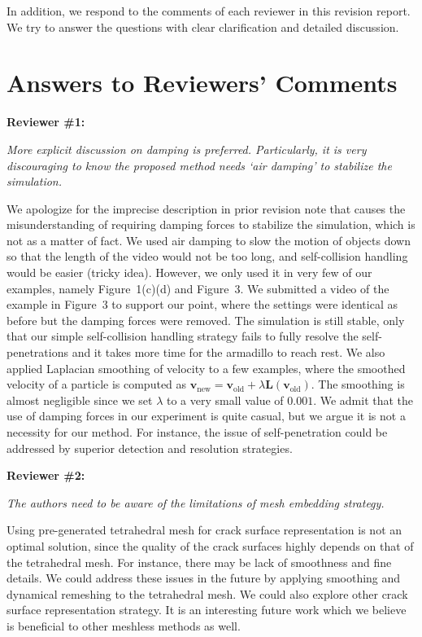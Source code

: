 In addition, we respond to the comments of each reviewer in this revision report. We try to answer the questions with clear clarification and detailed discussion.
\section{Answers to Reviewers' Comments}

\noindent{}\textbf{Reviewer \#1:}

\emph{More explicit discussion on damping is preferred. Particularly, it is very discouraging to know the proposed method needs `air damping' to stabilize the simulation.}

We apologize for the imprecise description in prior revision note that causes the misunderstanding of requiring damping forces to stabilize the simulation, which is not as a matter of fact. We used air damping to slow the motion of objects down so that the length of the video would not be too long, and self-collision handling would be easier (tricky idea). However, we only used it in very few of our examples, namely Figure~1(c)(d) and Figure~3. We submitted a video of the example in Figure~3 to support our point, where the settings were identical as before but the damping forces were removed. The simulation is still stable, only that our simple self-collision handling strategy fails to fully resolve the self-penetrations and it takes more time for the armadillo to reach rest. We also applied Laplacian smoothing of velocity to a few examples, where the smoothed velocity of a particle is computed as $\mathbf{v}_{\mathrm{new}}=\mathbf{v}_{\mathrm{old}}+\lambda \mathbf{L}(\mathbf{v}_{\mathrm{old}})$. The smoothing is almost negligible since we set $\lambda$ to a very small value of $0.001$. We admit that the use of damping forces in our experiment is quite casual, but we argue it is not a necessity for our method. For instance, the issue of self-penetration could be addressed by superior detection and resolution strategies.

\noindent{}\textbf{Reviewer \#2:}

\emph{The authors need to be aware of the limitations of mesh embedding strategy.}

Using pre-generated tetrahedral mesh for crack surface representation is not an optimal solution, since the quality of the crack surfaces highly depends on that of the tetrahedral mesh. For instance, there may be lack of smoothness and fine details. We could address these issues in the future by applying smoothing and dynamical remeshing to the tetrahedral mesh. We could also explore other crack surface representation strategy. It is an interesting future work which we believe is beneficial to other meshless methods as well.

